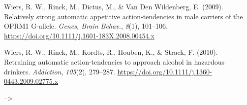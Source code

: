 \documentclass[man,floatsintext]{apa6}
\begin{document}
\leavevmode\hypertarget{ref-wiers_relatively_2009}{}%
Wiers, R. W., Rinck, M., Dictus, M., \& Van Den Wildenberg, E. (2009). Relatively strong automatic appetitive action-tendencies in male carriers of the OPRM1 G-allele. \emph{Genes, Brain Behav.}, \emph{8}(1), 101--106. \url{https://doi.org/10.1111/j.1601-183X.2008.00454.x}

\leavevmode\hypertarget{ref-wiers_retraining_2010}{}%
Wiers, R. W., Rinck, M., Kordts, R., Houben, K., \& Strack, F. (2010). Retraining automatic action-tendencies to approach alcohol in hazardous drinkers. \emph{Addiction}, \emph{105}(2), 279--287. \url{https://doi.org/10.1111/j.1360-0443.2009.02775.x}

\endgroup --\textgreater{}
\end{document}
